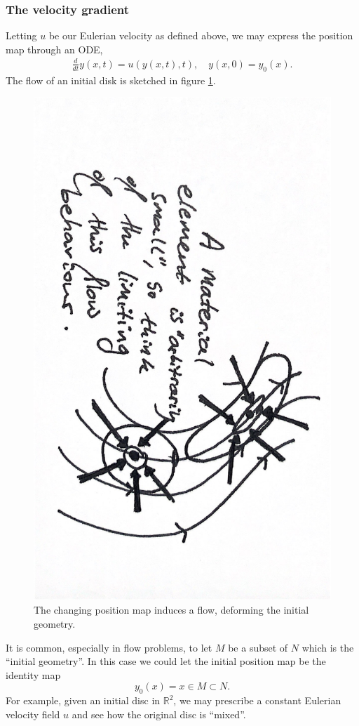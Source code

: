 \subsubsection{The velocity gradient}
Letting $u$ be our Eulerian velocity as defined above, we may express the position map through an ODE,
\begin{equation}\label{position_map_ode}
\begin{split}
    \frac{d}{dt} y(x, t) = u(y(x, t), t),\quad
    y(x, 0) = y_0(x).
\end{split}
\end{equation}
The flow of an initial disk is sketched in figure \ref{sketch_deformation}.
\begin{figure}
\centerline{\includegraphics[angle=90,page=5,width=0.4\linewidth]{figures/2.pdf}}
\caption{\small The changing position map induces a flow, deforming the initial geometry.}
\label{sketch_deformation}
\end{figure}
It is common, especially in flow problems, to let $M$ be a subset of $N$ which is the ``initial geometry''.
In this case we could let the initial position map be the identity map
    $$y_0(x) = x \in M \subset N.$$
For example, given an initial disc in $\mathbb{R}^2$, we may prescribe a constant Eulerian velocity field $u$ and
see how the original disc is ``mixed''.


